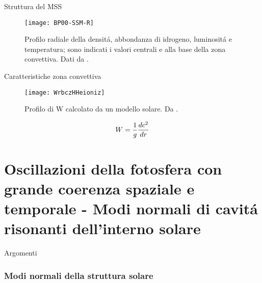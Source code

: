 \documentclass[10pt,xcolor={usenames},fleqn,mathserif,serif]{beamer}
\begin{document}
\begin{frame}{Struttura del MSS}

\begin{figure}[!h]
\texttt{[image: BP00-SSM-R]}
\caption{Profilo radiale della densit\'a, abbondanza di idrogeno, luminosit\'a e temperatura; sono indicati i valori centrali e alla base della zona convettiva. Dati da \cite{BP2000}.}
\end{figure}

\end{frame}

\begin{frame}{Caratteristiche zona convettiva}

\begin{figure}[!ht]
        \texttt{[image: WrbczHHeioniz]}
        \caption{Profilo di W calcolato da un modello solare. Da \cite{basu2008helioseismology}.}\label{fig:dlessc}
    
\end{figure}

\begin{equation}
W=\frac{1}{g}\TDy{r}{c^2}%
\end{equation}

\end{frame}

\part{Oscillazioni della fotosfera con grande coerenza spaziale e temporale - Modi normali di cavit\'a risonanti dell'interno solare}\label{part:oscillations}

\frame{\partpage}

\begin{frame}{Argomenti}
  \tableofcontents[part=2,hideallsubsections%
  ]
\end{frame}

\section{Modi normali della struttura solare}
\end{document}
